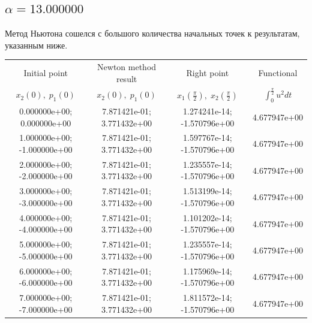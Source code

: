\documentclass[titlepage]{article}
\def\l{\left}
\def\r{\right}
\begin{document}
\subsection{$\alpha = 13.000000$} 
Метод Ньютона сошелся с большого количества начальных точек к результатам, указанным ниже. \\ 
\begin{tabular}{ | c | c | c | c |} 
\hline 
Initial point  & Newton method result & Right point & Functional 
 \\ $x_2(0), \; p_1(0)$ & $x_2(0), \; p_1(0)$ & $x_1\l(\frac{\pi}{2}\r), \; x_2\l(\frac{\pi}{2}\r)$ & $\int_{0}^{\frac{\pi}{2}}u^2dt$  \\ \hline 
0.000000e+00; 0.000000e+00 & 7.871421e-01; 3.771432e+00 & 1.274241e-14; -1.570796e+00 & 4.677947e+00 \\ \hline 
1.000000e+00; -1.000000e+00 & 7.871421e-01; 3.771432e+00 & 1.597767e-14; -1.570796e+00 & 4.677947e+00 \\ \hline 
2.000000e+00; -2.000000e+00 & 7.871421e-01; 3.771432e+00 & 1.235557e-14; -1.570796e+00 & 4.677947e+00 \\ \hline 
3.000000e+00; -3.000000e+00 & 7.871421e-01; 3.771432e+00 & 1.513199e-14; -1.570796e+00 & 4.677947e+00 \\ \hline 
4.000000e+00; -4.000000e+00 & 7.871421e-01; 3.771432e+00 & 1.101202e-14; -1.570796e+00 & 4.677947e+00 \\ \hline 
5.000000e+00; -5.000000e+00 & 7.871421e-01; 3.771432e+00 & 1.235557e-14; -1.570796e+00 & 4.677947e+00 \\ \hline 
6.000000e+00; -6.000000e+00 & 7.871421e-01; 3.771432e+00 & 1.175969e-14; -1.570796e+00 & 4.677947e+00 \\ \hline 
7.000000e+00; -7.000000e+00 & 7.871421e-01; 3.771432e+00 & 1.811572e-14; -1.570796e+00 & 4.677947e+00 \\ \hline 
\end{tabular} 
\end{document}
